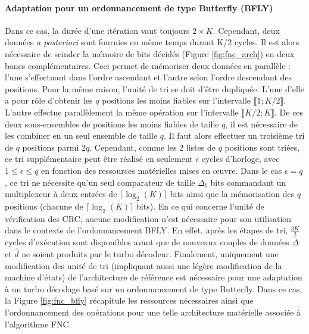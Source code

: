 \paragraph*{Adaptation pour un ordonnancement de type Butterfly (BFLY)}
Dans ce cas, la durée d'une itération vaut toujours $2\times K$. Cependant, deux données \textit{a posteriori} sont 
fournies en même temps durant K/2 cycles. Il est alors nécessaire de scinder la mémoire de bits décidés (Figure 
\ref{fig:fnc_arch}) en deux bancs complémentaires.
Ceci permet de mémoriser deux données en parallèle : l'une s'effectuant dans l'ordre ascendant 
et l'autre selon l'ordre descendant des positions. Pour la même raison, l'unité de tri se doit d'être dupliquée. L'une
d'elle a pour rôle d'obtenir les $q$ positions les moins fiables sur l'intervalle $\llbracket 1; K/2 \rrbracket$. L'autre
effectue parallèlement la même opération sur l'intervalle $\rrbracket K/2; K \rrbracket$. De ces deux sous-ensembles de positions
les moins fiables de taille $q$, il est nécessaire de les combiner en un seul ensemble de taille $q$. Il faut alors 
effectuer un troisième tri de $q$ positions parmi $2q$. Cependant, comme les 2 listes de $q$ positions sont triées, ce 
tri supplémentaire peut être réalisé en seulement $\epsilon$ cycles d'horloge, avec $1\leq \epsilon \leq q$ en fonction
des ressources matérielles mises en œuvre. Dans le cas $\epsilon = q$, ce tri ne nécessite qu'un seul comparateur 
de taille $\Delta_b$ bits commandant un multiplexeur à deux entrées de $\lceil\log_2(K)\rceil$ bits ainsi que la 
mémorisation des $q$ positions (chacune de $\lceil\log_2(K)\rceil$ bits). En ce qui concerne l'unité de vérification des CRC, aucune modification n'est nécessaire pour
son utilisation dans le contexte de l'ordonnancement BFLY. En effet, après les étapes de tri, $\frac{3K}{2}$ cycles 
d'exécution sont disponibles avant que de nouveaux couples de données $\Delta$ et $\hat{d}$ ne soient produits par le
turbo décodeur. Finalement, uniquement une modification des unité de tri (impliquant aussi une légère modification de 
la machine d'états) de l'architecture de référence est nécessaire pour une adaptation à un turbo décodage basé sur un 
ordonnancement de type Butterfly. Dans ce cas, la Figure \ref{fig:fnc_bfly} récapitule les ressources nécessaires ainsi 
que l'ordonnancement des opérations pour une telle architecture matérielle associée à l'algorithme FNC.

